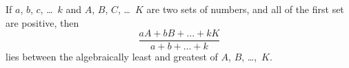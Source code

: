 If $a$, $b$, $c$, \dots~$k$ and $A$, $B$, $C$, \dots~$K$ are two sets of numbers, and all of
the first set are positive, then
\[
\frac{aA + bB + \dots + kK}{a + b + \dots + k}
\]
lies between the algebraically least and greatest of $A$, $B$, \dots,~$K$.

